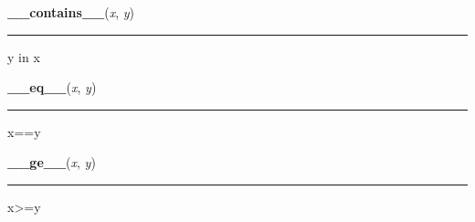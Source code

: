     \label{time:struct_time:__contains__}

    \vspace{0.5ex}

\hspace{.8\funcindent}\begin{boxedminipage}{\funcwidth}

    \raggedright \textbf{\_\_contains\_\_}(\textit{x}, \textit{y})

    \vspace{-1.5ex}

    \rule{\textwidth}{0.5\fboxrule}
\setlength{\parskip}{2ex}
    y in x

\setlength{\parskip}{1ex}
    \end{boxedminipage}

    \label{time:struct_time:__eq__}

    \vspace{0.5ex}

\hspace{.8\funcindent}\begin{boxedminipage}{\funcwidth}

    \raggedright \textbf{\_\_eq\_\_}(\textit{x}, \textit{y})

    \vspace{-1.5ex}

    \rule{\textwidth}{0.5\fboxrule}
\setlength{\parskip}{2ex}
    x==y

\setlength{\parskip}{1ex}
    \end{boxedminipage}

    \label{time:struct_time:__ge__}

    \vspace{0.5ex}

\hspace{.8\funcindent}\begin{boxedminipage}{\funcwidth}

    \raggedright \textbf{\_\_ge\_\_}(\textit{x}, \textit{y})

    \vspace{-1.5ex}

    \rule{\textwidth}{0.5\fboxrule}
\setlength{\parskip}{2ex}
    x{\textgreater}=y

\setlength{\parskip}{1ex}
    \end{boxedminipage}

